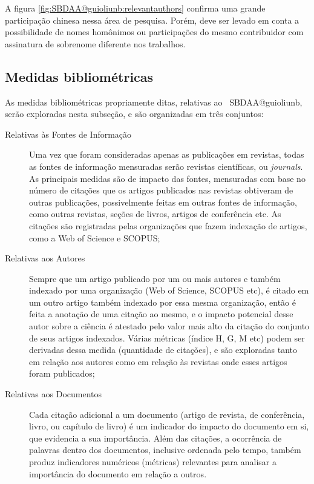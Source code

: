 A figura \ref{fig:SBDAA@guioliunb:relevantauthors} confirma uma grande participação chinesa nessa área de pesquisa. Porém, deve ser levado em conta a possibilidade de nomes homônimos ou participações do mesmo contribuidor com assinatura de sobrenome diferente nos trabalhos.


\subsection{Medidas bibliométricas}

As medidas bibliométricas propriamente ditas, relativas ao \dataset\ SBDAA@guioliunb, serão exploradas nesta subseção, e são organizadas em três conjuntos:
\begin{description}
    \item [Relativas às Fontes de Informação] Uma vez que foram consideradas apenas as publicações em revistas, todas as fontes de informação mensuradas serão revistas científicas, ou \textit{journals}. As principais medidas são de impacto das fontes, mensuradas com base no número de citações que os artigos publicados nas revistas obtiveram de outras publicações, possivelmente feitas em outras fontes de informação, como outras revistas, seções de livros, artigos de conferência etc. As citações são registradas pelas organizações que fazem indexação de artigos, como a Web of Science e SCOPUS;
    \item [Relativas aos Autores] Sempre que um artigo publicado por um ou mais autores e também indexado por uma organização (Web of Science,  SCOPUS etc), é citado em um outro artigo também indexado por essa mesma organização, então é feita a anotação de uma citação ao mesmo, e o impacto potencial desse autor sobre a ciência é atestado pelo valor mais alto da citação do conjunto de seus artigos indexados. Várias métricas (índice H, G, M etc) podem ser derivadas dessa medida (quantidade de citações), e são exploradas tanto em relação aos autores como em relação às revistas onde esses artigos foram publicados;
    \item [Relativas aos Documentos] Cada citação adicional a  um documento (artigo de revista, de conferência, livro, ou  capítulo de livro) é um indicador do impacto do documento em si, que evidencia a sua importância. Além das citações, a ocorrência de palavras dentro dos documentos, inclusive ordenada pelo tempo, também produz indicadores numéricos (métricas) relevantes para analisar a importância do documento em relação a outros. 
\end{description}

